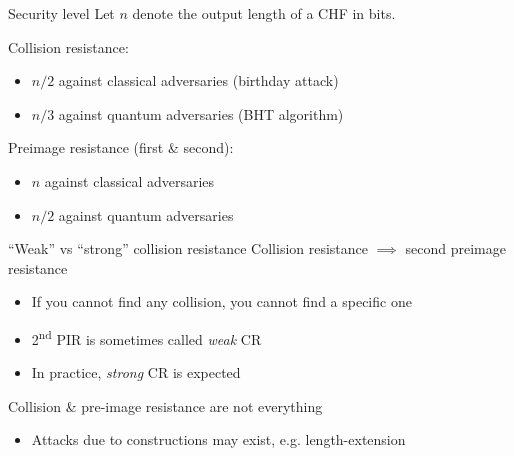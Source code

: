 \begin{frame}{Security level}
  Let $n$ denote the output length of a CHF in bits.

  \vspace*{1em}

  \pause
  Collision resistance:
  \begin{itemize}[<+(1)->]
    \item $n/2$ against classical adversaries (birthday attack)
    \item $n/3$ against quantum adversaries (BHT algorithm)
  \end{itemize}

  \vspace*{1em}

  \pause
  Preimage resistance (first \& second):
  \begin{itemize}[<+(1)->]
    \item $n$ against classical adversaries
    \item $n/2$ against quantum adversaries
  \end{itemize}
\end{frame}

\begin{frame}{\enquote{Weak} vs \enquote{strong} collision resistance}
  Collision resistance $\implies$ second preimage resistance
  \begin{itemize}[<+(1)->]
    \item If you cannot find any collision, you cannot find a specific one
    \item 2\textsuperscript{nd} PIR is sometimes called \emph{weak} CR
    \item In practice, \emph{strong} CR is expected
  \end{itemize}

  \vspace*{1em}

  \pause
  Collision \& pre-image resistance are not everything
  \begin{itemize}[<+(1)->]
    \item Attacks due to constructions may exist, e.g. length-extension
  \end{itemize}
\end{frame}

